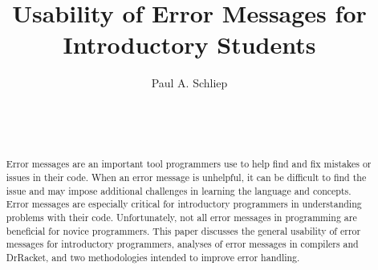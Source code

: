 \documentclass{sig-alternate}
\begin{document}

\title{Usability of Error Messages for Introductory Students}


\author{
\alignauthor
Paul A. Schliep\\
	\\
	\\
	\\
}

\maketitle
\begin{abstract}
Error messages are an important tool programmers use to help find and fix mistakes or issues in their code.
When an error message is unhelpful, it can be difficult to find the issue and may impose additional challenges in learning the language and concepts.
Error messages are especially critical for introductory programmers in understanding problems with their code.
Unfortunately, not all error messages in programming are beneficial for novice programmers.
This paper discusses the general usability of error messages for introductory programmers, analyses of error messages in compilers and DrRacket, and two methodologies intended to improve error handling.

\end{abstract}

\end{document}
